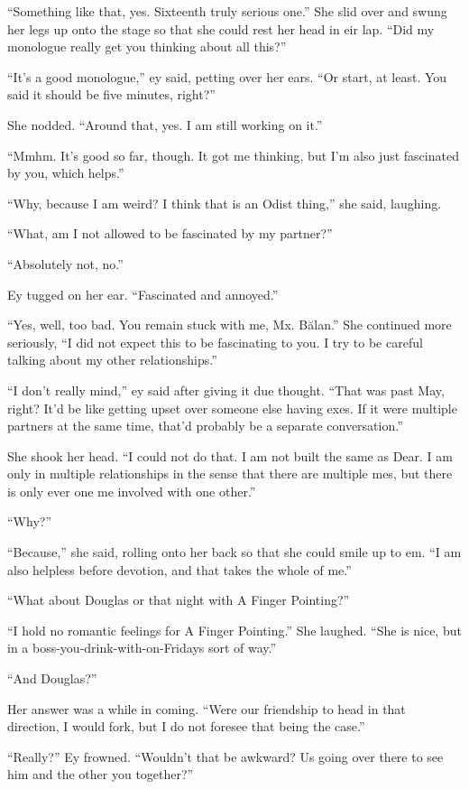 ``Something like that, yes. Sixteenth truly serious one.'' She slid over and swung her legs up onto the stage so that she could rest her head in eir lap. ``Did my monologue really get you thinking about all this?''

``It's a good monologue,'' ey said, petting over her ears. ``Or start, at least. You said it should be five minutes, right?''

She nodded. ``Around that, yes. I am still working on it.''

``Mmhm. It's good so far, though. It got me thinking, but I'm also just fascinated by you, which helps.''

``Why, because I am weird? I think that is an Odist thing,'' she said, laughing.

``What, am I not allowed to be fascinated by my partner?''

``Absolutely not, no.''

Ey tugged on her ear. ``Fascinated and annoyed.''

``Yes, well, too bad. You remain stuck with me, Mx. Bălan.'' She continued more seriously, ``I did not expect this to be fascinating to you. I try to be careful talking about my other relationships.''

``I don't really mind,'' ey said after giving it due thought. ``That was past May, right? It'd be like getting upset over someone else having exes. If it were multiple partners at the same time, that'd probably be a separate conversation.''

She shook her head. ``I could not do that. I am not built the same as Dear. I am only in multiple relationships in the sense that there are multiple mes, but there is only ever one me involved with one other.''

``Why?''

``Because,'' she said, rolling onto her back so that she could smile up to em. ``I am also helpless before devotion, and that takes the whole of me.''

``What about Douglas or that night with A Finger Pointing?''

``I hold no romantic feelings for A Finger Pointing.'' She laughed. ``She is nice, but in a boss-you-drink-with-on-Fridays sort of way.''

``And Douglas?''

Her answer was a while in coming. ``Were our friendship to head in that direction, I would fork, but I do not foresee that being the case.''

``Really?'' Ey frowned. ``Wouldn't that be awkward? Us going over there to see him and the other you together?''

